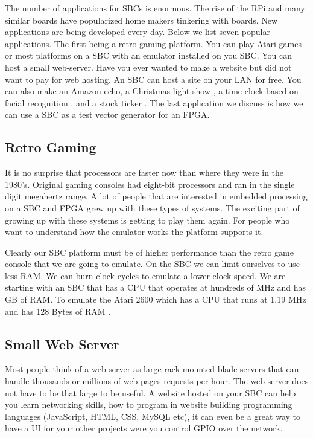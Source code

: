 The number of applications for \ac{SBC}s is enormous. The rise of the \ac{RPi} and many similar boards have popularized home makers tinkering with boards. New applications are being developed every day. Below we list seven popular applications. The first being a retro gaming platform. You can play Atari games or most platforms on a \ac{SBC} with an emulator installed on you \ac{SBC}. You can host a small web-server. Have you ever wanted to make a website but did not want to pay for web hosting. An \ac{SBC} can host a site on your \ac{LAN} for free. You can also make an Amazon echo, a Christmas light show \cite{cliteshow}, a time clock based on facial recognition \cite{facepunch}, and a stock ticker \cite{stocktick}. The last application we discuss is how we can use a \ac{SBC} as a test vector generator for an \ac{FPGA}. 

\subsection{Retro Gaming}
	
It is no surprise that processors are faster now than where they were in the 1980's. Original gaming consoles had eight-bit processors and ran in the single digit megahertz range. A lot of people that are interested in embedded processing on a \ac{SBC} and \ac{FPGA} grew up with these types of systems. The exciting part of growing up with these systems is getting to play them again. For people who want to understand how the emulator works the platform supports it.

Clearly our \ac{SBC} platform must be of higher performance than the retro game console that we are going to emulate. On the \ac{SBC} we can limit ourselves to use less \ac{RAM}. We can burn clock cycles to emulate a lower clock speed. We are starting with an \ac{SBC} that has a \ac{CPU} that operates at hundreds of \ac{MHz} and has \ac{GB} of \ac{RAM}. To emulate the Atari 2600 which has a \ac{CPU} that runs at 1.19 \ac{MHz} and has 128 Bytes of \ac{RAM} \cite{atarispec}.

\subsection{Small Web Server}

Most people think of a web server as large rack mounted blade servers that can handle thousands or millions of web-pages requests per hour. The web-server does not have to be that large to be useful. A website hosted on your \ac{SBC} can help you learn networking skills, how to program in website building programming languages (JavaScript, \ac{HTML}, \ac{CSS}, MySQL etc), it can even be a great way to have a \ac{UI} for your other projects were you control \ac{GPIO} over the network.

